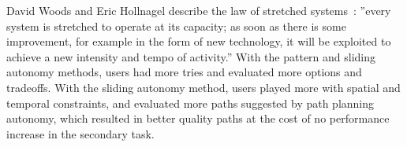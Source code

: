 David Woods and Eric Hollnagel describe the law of stretched systems~\cite{Woods2006Joint}: ''every system is stretched to operate at its capacity; as soon as there is some improvement, for example in the form of new technology, it will be exploited to achieve a new intensity and tempo of activity.'' With the pattern and sliding autonomy methods, users had more tries and evaluated more options and tradeoffs. With the sliding autonomy method, users played more with spatial and temporal constraints, and evaluated more paths suggested by path planning autonomy, which resulted in better quality paths at the cost of no performance increase in the secondary task.

%
%
